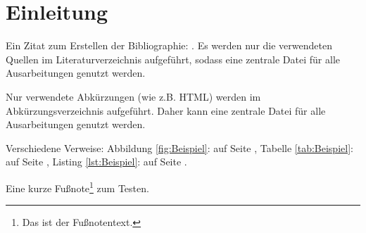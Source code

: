 \section{Einleitung}
\label{sec:Einleitung}

Ein Zitat zum Erstellen der Bibliographie: \cite{Martin2008}. 
Es werden nur die verwendeten Quellen im Literaturverzeichnis aufgeführt, sodass
eine zentrale Datei für alle Ausarbeitungen genutzt werden.

Nur verwendete Abkürzungen (wie z.B. \ac{HTML}) werden im Abkürzungsverzeichnis aufgeführt.
Daher kann eine zentrale Datei für alle Ausarbeitungen genutzt werden.

Verschiedene Verweise: Abbildung \ref{fig:Beispiel}:  auf Seite \pageref{fig:Beispiel}, Tabelle \ref{tab:Beispiel}:  auf Seite \pageref{tab:Beispiel}, Listing \ref{lst:Beispiel}:  auf Seite \pageref{lst:Beispiel}.

Eine kurze Fußnote\footnote{Das ist der Fußnotentext.} zum Testen.